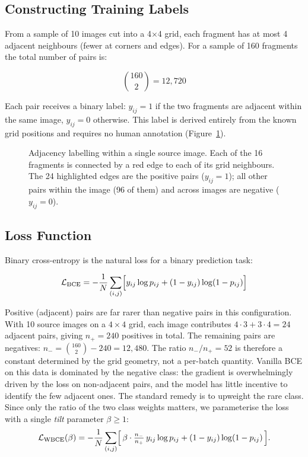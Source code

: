 \documentclass[12pt, a4paper]{article}
\begin{document}
\subsection{Constructing Training Labels}

From a sample of 10 images cut into a 4$\times$4 grid, each fragment has at most 4
adjacent neighbours (fewer at corners and edges). For a sample of 160 fragments the
total number of pairs is:

\[
\binom{160}{2} = 12{,}720
\]

Each pair receives a binary label: $y_{ij} = 1$ if the two fragments are adjacent within
the same image, $y_{ij} = 0$ otherwise. This label is derived entirely from the known
grid positions and requires no human annotation
(Figure~\ref{fig:grid-labels}).

\begin{figure}[h]
\centering

\caption{Adjacency labelling within a single source image. Each of the 16
fragments is connected by a red edge to each of its grid neighbours. The
24 highlighted edges are the positive pairs ($y_{ij} = 1$); all other pairs
within the image (96 of them) and across images are negative ($y_{ij} = 0$).}
\label{fig:grid-labels}
\end{figure}

\subsection{Loss Function}
\label{sec:loss}

Binary cross-entropy is the natural loss for a binary prediction task:

\[
\mathcal{L}_{\text{BCE}} = -\frac{1}{N}\sum_{(i,j)} \Bigl[ y_{ij} \log p_{ij} + (1 - y_{ij}) \log(1 - p_{ij}) \Bigr]
\]

Positive (adjacent) pairs are far rarer than negative pairs in this configuration.
With 10 source images on a $4 \times 4$ grid, each image contributes
$4 \cdot 3 + 3 \cdot 4 = 24$ adjacent pairs, giving $n_{+} = 240$ positives in
total. The remaining pairs are negatives: $n_{-} = \binom{160}{2} - 240 = 12{,}480$.
The ratio $n_{-}/n_{+} = 52$ is therefore a constant determined by the grid
geometry, not a per-batch quantity. Vanilla BCE on this data is dominated by the
negative class: the gradient is overwhelmingly driven by the loss on non-adjacent
pairs, and the model has little incentive to identify the few adjacent ones. The
standard remedy is to upweight the rare class. Since only the ratio of the two
class weights matters, we parameterise the loss with a single \emph{tilt}
parameter $\beta \geq 1$:
\begin{equation}
\mathcal{L}_{\text{WBCE}}(\beta) = -\frac{1}{N}\sum_{(i,j)}
    \Bigl[\, \beta \cdot \tfrac{n_{-}}{n_{+}}\, y_{ij} \log p_{ij}
       + (1 - y_{ij}) \log(1 - p_{ij}) \,\Bigr].
\label{eq:wbce}
\end{equation}
\end{document}

